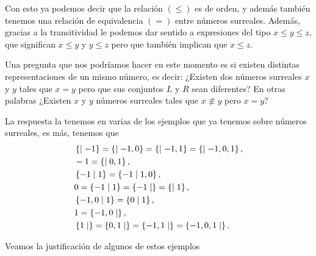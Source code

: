     Con esto ya podemos decir que la relaci\'on $(\le)$ es de orden, y adem\'as tambi\'en tenemos una relaci\'on de equivalencia $(=)$ entre n\'umeros surreales. Adem\'as, gracias a la transitividad le podemos dar sentido a expresiones del tipo $x \le y \le z$, que significan $x\le y$ y $y\le z$ pero que tambi\'en implican que $x \le z$.

    Una pregunta que nos podr\'iamos hacer en este momento es si existen distintas representaciones de un mismo n\'umero, es decir: ¿Existen dos n\'umeros surreales $x$ y $y$ tales que $x=y$ pero que sus conjuntos $L$ y $R$ sean diferentes? En otras palabras ¿Existen $x$ y $y$ n\'umeros surreales tales que $x\not\equiv y$ pero $x = y$?

    La respuesta la tenemos en varias de los ejemplos que ya tenemos sobre n\'umeros surreales, es m\'as, tenemos que
    \begin{align*}
        &\left\{\mid -1\right\} = \left\{\mid -1,0\right\} = \left\{\mid -1,1\right\} = \left\{\mid -1,0,1\right\}, \\
        &-1 = \left\{\mid 0,1\right\},\\
        &\left\{-1\mid 1\right\} = \left\{-1\mid 1,0\right\},\\
        &0 = \left\{-1\mid 1\right\} = \left\{-1\mid \right\} = \left\{\mid 1\right\},\\
        &\left\{-1,0\mid 1\right\} = \left\{0\mid 1\right\},\\
        &1 = \left\{-1,0\mid \right\},\\
        &\left\{1\mid \right\} = \left\{0,1\mid \right\} = \left\{-1,1\mid \right\} = \left\{-1,0,1\mid \right\}.
    \end{align*}

    Veamos la justificaci\'on de algunos de estos ejemplos

